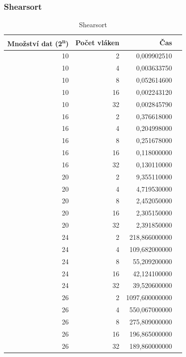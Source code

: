 \documentclass[12pt]{article}
\begin{document}
\subsubsection{Shearsort}
\begin{table}[H]
\begin{center}
\begin{tabular}{|r|r|r|r|}
\hline Množství dat (2\textsuperscript{n}) & Počet vláken & Čas \\ \hline
10 &  2  & 0,009902510 \\ \hline
10 &  4  & 0,003633750 \\ \hline
10 &  8  & 0,052614600 \\ \hline
10 &  16 & 0,002243120 \\ \hline
10 &  32 & 0,002845790 \\ \hline
16 &  2  & 0,376618000 \\ \hline
16 &  4  & 0,204998000 \\ \hline
16 &  8  & 0,251678000 \\ \hline
16 &  16 & 0,118000000 \\ \hline
16 &  32 & 0,130110000 \\ \hline
20 &  2  & 9,355110000 \\ \hline
20 &  4  & 4,719530000 \\ \hline
20 &  8  & 2,452050000 \\ \hline
20 &  16 & 2,305150000 \\ \hline
20 &  32 & 2,391850000 \\ \hline
24 &  2  & 218,866000000 \\ \hline
24 &  4  & 109,682000000 \\ \hline
24 &  8  & 55,209200000 \\ \hline
24 &  16 & 42,124100000 \\ \hline
24 &  32 & 39,520600000 \\ \hline
26 &  2  & 1097,600000000 \\ \hline
26 &  4  & 550,067000000 \\ \hline
26 &  8  & 275,809000000 \\ \hline
26 &  16 & 196,865000000 \\ \hline
26 &  32 & 189,860000000 \\ \hline
\end{tabular} 
\end{center}
\caption{Shearsort}
\end{table}
\end{document}
